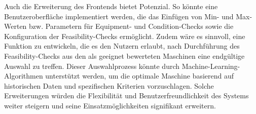 Auch die Erweiterung des Frontends bietet Potenzial. So könnte eine Benutzeroberfläche implementiert werden, die das Einfügen von Min- und Max-Werten bzw. Parametern für Equipment- und Condition-Checks sowie die Konfiguration der Feasibility-Checks ermöglicht. Zudem wäre es sinnvoll, eine Funktion zu entwickeln, die es den Nutzern erlaubt, nach Durchführung des Feasibility-Checks aus den als geeignet bewerteten Maschinen eine endgültige Auswahl zu treffen. Dieser Auswahlprozess könnte durch Machine-Learning-Algorithmen unterstützt werden, um die optimale Maschine basierend auf historischen Daten und spezifischen Kriterien vorzuschlagen. Solche Erweiterungen würden die Flexibilität und Benutzerfreundlichkeit des Systems weiter steigern und seine Einsatzmöglichkeiten signifikant erweitern.
